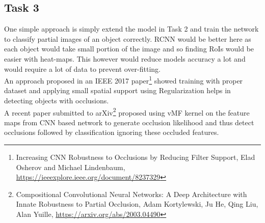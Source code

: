 \documentclass[12pt, fleqn]{article}
\begin{document}
\subsection{Task 3}
One simple approach is simply extend the model in Task 2 and train the network to classify partial images of an object correctly. RCNN would be better here as each object would take small portion of the image and so finding RoIs would be easier with heat-maps. This however would reduce models accuracy a lot and would require a lot of data to prevent over-fitting. \\

An approach proposed in an IEEE 2017 paper\footnote{Increasing CNN Robustness to Occlusions by Reducing Filter Support, Elad Osherov and Michael Lindenbaum, \url{https://ieeexplore.ieee.org/document/8237329}} showed training with proper dataset and applying small spatial support using Regularization helps in detecting objects with occlusions. \\

A recent paper submitted to arXiv\footnote{Compositional Convolutional Neural Networks: A Deep Architecture with Innate Robustness to Partial Occlusion, Adam Kortylewski, Ju He, Qing Liu, Alan Yuille, \url{https://arxiv.org/abs/2003.04490}} proposed using vMF kernel on the feature maps from CNN based network to generate occlusion likelihood and thus detect occlusions followed by classification ignoring these occluded features. \\
\end{document}
